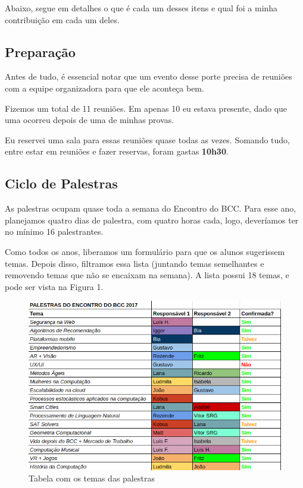 \documentclass[12pt,letterpaper]{article}
\begin{document}
	Abaixo, segue em detalhes o que é cada um desses itens e qual foi a minha contribuição em cada um deles.
	
	\subsection{Preparação}
	
	Antes de tudo, é essencial notar que um evento desse porte precisa de reuniões com a equipe organizadora para que ele aconteça bem. 
	
	Fizemos um total de 11 reuniões. Em apenas 10 eu estava presente, dado que uma ocorreu depois de uma de minhas provas.
	
	Eu reservei uma sala para essas reuniões quase todas as vezes. Somando tudo, entre estar em reuniões e fazer reservas, foram gastas \textbf{10h30}.
	
	\subsection{Ciclo de Palestras}
	
	As palestras ocupam quase toda a semana do Encontro do BCC. Para esse ano, planejamos quatro dias de palestra, com quatro horas cada, logo, deveríamos ter no mínimo 16 palestrantes.
	
	Como todos os anos, liberamos um formulário para que os alunos sugerissem temas. Depois disso, filtramos essa lista (juntando temas semelhantes e removendo temas que não se encaixam na semana). A lista possui 18 temas, e pode ser vista na Figura 1.
	
	\begin{figure}
		\begin{center}
			\includegraphics[scale=0.6]{palestras.png} 
			\caption{Tabela com os temas das palestras}
		\end{center}
	\end{figure}
\end{document}
